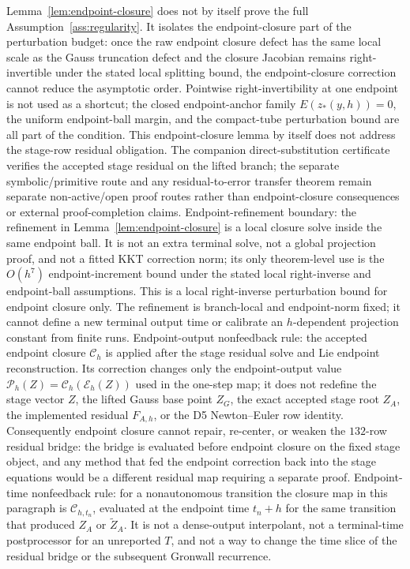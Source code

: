 \documentclass[preprint,12pt]{elsarticle}
\begin{document}
Lemma~\ref{lem:endpoint-closure} does not by itself prove the full
Assumption~\ref{ass:regularity}. It isolates the endpoint-closure part of the
perturbation budget: once the raw endpoint closure defect has the same local
scale as the Gauss truncation defect and the closure Jacobian remains
right-invertible under the stated local splitting bound, the endpoint-closure
correction cannot reduce the asymptotic order. Pointwise right-invertibility
at one endpoint is not used as a shortcut; the closed endpoint-anchor family
\(E(z_\ast(y,h))=0\), the uniform endpoint-ball margin, and the compact-tube
perturbation bound are all part of the condition. This endpoint-closure lemma by itself does not address the
stage-row residual obligation. The companion direct-substitution certificate
verifies the accepted stage residual on the lifted branch; the separate
symbolic/primitive route and any residual-to-error transfer theorem remain
separate non-active/open proof routes rather than endpoint-closure
consequences or external proof-completion claims.
Endpoint-refinement boundary: the refinement in
Lemma~\ref{lem:endpoint-closure} is a local closure solve inside the same
endpoint ball. It is not an extra terminal solve, not a global projection
proof, and not a fitted KKT correction norm; its only theorem-level use is
the \(O(h^7)\) endpoint-increment bound under the stated local right-inverse
and endpoint-ball assumptions. This is a local right-inverse perturbation
bound for endpoint closure only. The refinement is branch-local and
endpoint-norm fixed; it cannot define a new terminal output time or calibrate
an \(h\)-dependent projection constant from finite runs.
Endpoint-output nonfeedback rule: the accepted endpoint closure
\(\mathcal C_h\) is applied after the stage residual solve and Lie endpoint
reconstruction.  Its correction changes only the endpoint-output value
\(\mathcal P_h(Z)=\mathcal C_h(\mathcal E_h(Z))\) used in the one-step map;
it does not redefine the stage vector \(Z\), the lifted Gauss base point
\(Z_G\), the exact accepted stage root \(Z_A\), the implemented residual
\(F_{A,h}\), or the D5 Newton--Euler row identity.  Consequently endpoint
closure cannot repair, re-center, or weaken the \(132\)-row residual bridge:
the bridge is evaluated before endpoint closure on the fixed stage object,
and any method that fed the endpoint correction back into the stage equations
would be a different residual map requiring a separate proof.
Endpoint-time nonfeedback rule: for a nonautonomous transition the closure map
in this paragraph is \(\mathcal C_{h,t_n}\), evaluated at the endpoint time
\(t_n+h\) for the same transition that produced \(Z_A\) or
\(\widetilde Z_A\).  It is not a dense-output interpolant, not a terminal-time
postprocessor for an unreported \(T\), and not a way to change the time slice
of the residual bridge or the subsequent Gronwall recurrence.
\end{document}
